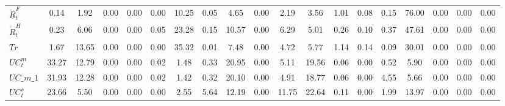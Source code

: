 \begin{center}
\begin{longtable}{lcccccccccccccccccc}
$  \tilde{R}^F_t    $	 & 	             0.14	 & 	             1.92	 & 	             0.00	 & 	             0.00	 & 	             0.00	 & 	            10.25	 & 	             0.05	 & 	             4.65	 & 	             0.00	 & 	             2.19	 & 	             3.56	 & 	             1.01	 & 	             0.08	 & 	             0.15	 & 	            76.00	 & 	             0.00	 & 	             0.00	 & 	             0.00 \\ 
$  \tilde{R}^H_t    $	 & 	             0.23	 & 	             6.06	 & 	             0.00	 & 	             0.00	 & 	             0.05	 & 	            23.28	 & 	             0.15	 & 	            10.57	 & 	             0.00	 & 	             6.29	 & 	             5.01	 & 	             0.26	 & 	             0.10	 & 	             0.37	 & 	            47.61	 & 	             0.00	 & 	             0.00	 & 	             0.00 \\ 
$ Tr                $	 & 	             1.67	 & 	            13.65	 & 	             0.00	 & 	             0.00	 & 	             0.00	 & 	            35.32	 & 	             0.01	 & 	             7.48	 & 	             0.00	 & 	             4.72	 & 	             5.77	 & 	             1.14	 & 	             0.14	 & 	             0.09	 & 	            30.01	 & 	             0.00	 & 	             0.00	 & 	             0.00 \\ 
$ UC^m_t            $	 & 	            33.27	 & 	            12.79	 & 	             0.00	 & 	             0.00	 & 	             0.02	 & 	             1.48	 & 	             0.33	 & 	            20.95	 & 	             0.00	 & 	             5.11	 & 	            19.56	 & 	             0.06	 & 	             0.00	 & 	             0.52	 & 	             5.90	 & 	             0.00	 & 	             0.00	 & 	             0.00 \\ 
$UC\_m\_1           $	 & 	            31.93	 & 	            12.28	 & 	             0.00	 & 	             0.00	 & 	             0.02	 & 	             1.42	 & 	             0.32	 & 	            20.10	 & 	             0.00	 & 	             4.91	 & 	            18.77	 & 	             0.06	 & 	             0.00	 & 	             4.55	 & 	             5.66	 & 	             0.00	 & 	             0.00	 & 	             0.00 \\ 
$ UC^s_t            $	 & 	            23.66	 & 	             5.50	 & 	             0.00	 & 	             0.00	 & 	             0.00	 & 	             2.55	 & 	             5.64	 & 	            12.19	 & 	             0.00	 & 	            11.75	 & 	            22.64	 & 	             0.11	 & 	             0.00	 & 	             1.99	 & 	            13.97	 & 	             0.00	 & 	             0.00	 & 	             0.00 \\ 

\end{longtable}
\end{center}
